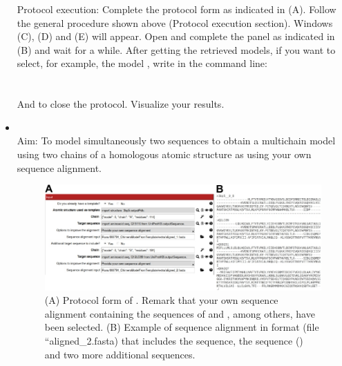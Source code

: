 \begin{itemize}
                 Protocol execution: Complete the protocol form as indicated in  (A). Follow the general procedure shown above (Protocol execution section). Windows (C), (D) and (E) will appear. Open and complete the  panel as indicated in (B) and wait for a while. After getting the retrieved models, if you want to select, for example, the  model , write in the command line:\\
                \\
                \\
                And \chimera {} to close the protocol. Visualize your results.
                            
                \item {}\\
                Aim: To model simultaneously two  sequences to obtain a multichain model using two chains of a homologous atomic structure as  using your own sequence alignment.

 
                            \begin{figure}[H]
                            \centering 
                            \captionsetup{width=.8\linewidth} 
                            \includegraphics[width=.9\textwidth]{Images_appendix/Fig307.pdf}
                            \caption{(A) Protocol form of . Remark that your own sequence alignment containing the sequences of  and , among others, have been selected. (B) Example of sequence alignment in  format (file ``aligned\_2.fasta) that includes the   sequence, the  sequence () and two more additional sequences.}  
                            \label{fig:app_protocol_seqHomology_4}
                            \end{figure}
                            

\end{itemize}
